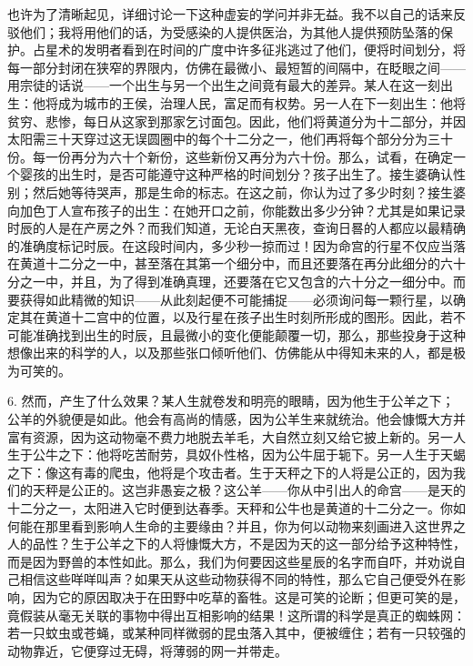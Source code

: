 也许为了清晰起见，详细讨论一下这种虚妄的学问并非无益。我不以自己的话来反驳他们；我将用他们的话，为受感染的人提供医治，为其他人提供预防坠落的保护。占星术的发明者看到在时间的广度中许多征兆逃过了他们，便将时间划分，将每一部分封闭在狭窄的界限内，仿佛在最微小、最短暂的间隔中，在眨眼之间——用宗徒的话说——一个出生与另一个出生之间竟有最大的差异。某人在这一刻出生：他将成为城市的王侯，治理人民，富足而有权势。另一人在下一刻出生：他将贫穷、悲惨，每日从这家到那家乞讨面包。因此，他们将黄道分为十二部分，并因太阳需三十天穿过这无误圆圈中的每个十二分之一，他们再将每个部分分为三十份。每一份再分为六十个新份，这些新份又再分为六十份。那么，试看，在确定一个婴孩的出生时，是否可能遵守这种严格的时间划分？孩子出生了。接生婆确认性别；然后她等待哭声，那是生命的标志。在这之前，你认为过了多少时刻？接生婆向加色丁人宣布孩子的出生：在她开口之前，你能数出多少分钟？尤其是如果记录时辰的人是在产房之外？而我们知道，无论白天黑夜，查询日晷的人都应以最精确的准确度标记时辰。在这段时间内，多少秒一掠而过！因为命宫的行星不仅应当落在黄道十二分之一中，甚至落在其第一个细分中，而且还要落在再分此细分的六十分之一中，并且，为了得到准确真理，还要落在它又包含的六十分之一细分中。而要获得如此精微的知识——从此刻起便不可能捕捉——必须询问每一颗行星，以确定其在黄道十二宫中的位置，以及行星在孩子出生时刻所形成的图形。因此，若不可能准确找到出生的时辰，且最微小的变化便能颠覆一切，那么，那些投身于这种想像出来的科学的人，以及那些张口倾听他们、仿佛能从中得知未来的人，都是极为可笑的。\par

6. 然而，产生了什么效果？某人生就卷发和明亮的眼睛，因为他生于公羊之下；公羊的外貌便是如此。他会有高尚的情感，因为公羊生来就统治。他会慷慨大方并富有资源，因为这动物毫不费力地脱去羊毛，大自然立刻又给它披上新的。另一人生于公牛之下：他将吃苦耐劳，具奴仆性格，因为公牛屈于轭下。另一人生于天蝎之下：像这有毒的爬虫，他将是个攻击者。生于天秤之下的人将是公正的，因为我们的天秤是公正的。这岂非愚妄之极？这公羊——你从中引出人的命宫——是天的十二分之一，太阳进入它时便到达春季。天秤和公牛也是黄道的十二分之一。你如何能在那里看到影响人生命的主要缘由？并且，你为何以动物来刻画进入这世界之人的品性？生于公羊之下的人将慷慨大方，不是因为天的这一部分给予这种特性，而是因为野兽的本性如此。那么，我们为何要因这些星辰的名字而自吓，并劝说自己相信这些咩咩叫声？如果天从这些动物获得不同的特性，那么它自己便受外在影响，因为它的原因取决于在田野中吃草的畜牲。这是可笑的论断；但更可笑的是，竟假装从毫无关联的事物中得出互相影响的结果！这所谓的科学是真正的蜘蛛网：若一只蚊虫或苍蝇，或某种同样微弱的昆虫落入其中，便被缠住；若有一只较强的动物靠近，它便穿过无碍，将薄弱的网一并带走。\par

